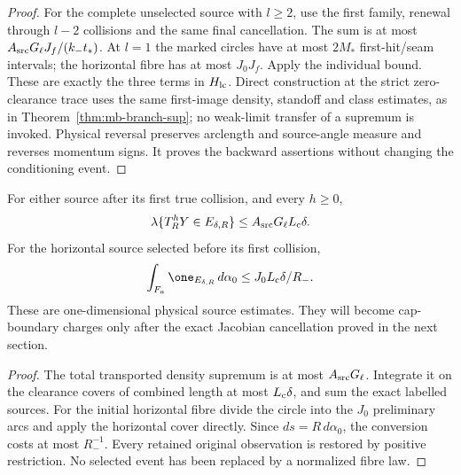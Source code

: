 \begin{proof}
For the complete unselected source with $l\ge2$, use the first
family, renewal through $l-2$ collisions and the same final
cancellation.  The sum is at most
$A_{\rm src}G_\ell J_f/(k_-t_*)$.  At $l=1$ the marked circles
have at most $2M_*$ first-hit/seam intervals; the horizontal fibre
has at most $J_0J_f$.  Apply the individual bound.  These are
exactly the three terms in $H_{\rm lc}$.  Direct construction at
the strict zero-clearance trace uses the same first-image density,
standoff and class estimates, as in
Theorem~\ref{thm:mb-branch-sup}; no weak-limit transfer of a
supremum is invoked.  Physical reversal preserves arclength and
source-angle measure and reverses momentum signs.  It proves the
backward assertions without changing the conditioning event.
\end{proof}

\begin{corollary}\label{cor:lc-source-mass}
For either source after its first true collision, and every $h\ge0$,
\begin{equation}\label{eq:lc-source-mass}
 \lambda\{T_R^hY\in E_{\delta,R}\}
                      \le A_{\rm src}G_\ell L_{\rm c}\delta.
\end{equation}
For the horizontal source selected before its first collision,
\begin{equation}\label{eq:lc-horizontal-initial}
 \int_{F_a}\one_{E_{\delta,R}}\,d\alpha_0
                       \le J_0L_{\rm c}\delta/R_-.
\end{equation}
These are one-dimensional physical source estimates.  They will
become cap-boundary charges only after the exact Jacobian
cancellation proved in the next section.
\end{corollary}
\begin{proof}
The total transported density supremum is at most
$A_{\rm src}G_\ell$.  Integrate it on the clearance covers of
combined length at most $L_{\rm c}\delta$, and sum the exact
labelled sources.  For the initial horizontal fibre divide the
circle into the $J_0$ preliminary arcs and apply the horizontal
cover directly.  Since $ds=R\,d\alpha_0$, the conversion costs
at most $R_-^{-1}$.  Every retained original observation is restored
by positive restriction.  No selected event has been replaced by
a normalized fibre law.
\end{proof}
